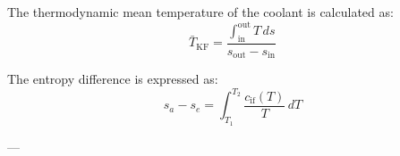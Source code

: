 The thermodynamic mean temperature of the coolant is calculated as:  
\[
\bar{T}_{\text{KF}} = \frac{\int_{\text{in}}^{\text{out}} T \, ds}{s_{\text{out}} - s_{\text{in}}}
\]  

The entropy difference is expressed as:  
\[
s_a - s_e = \int_{T_1}^{T_2} \frac{c_{\text{if}}(T)}{T} \, dT
\]  

---